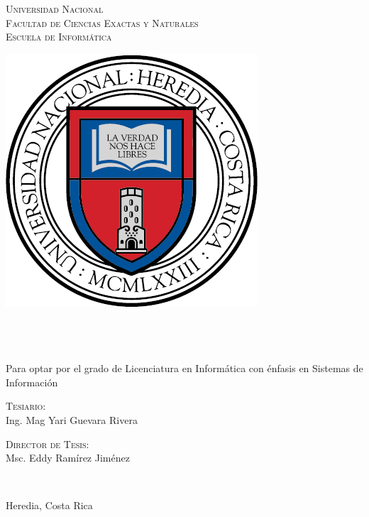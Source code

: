 \begin{titlepage}
	\begin{center}	
	\textcolor{unablue}{%
		\textsc{\LARGE Universidad Nacional}
		\\[0.5cm]
		\textsc{\Large Facultad de Ciencias Exactas y Naturales}
		\\[0.5cm]
		\textsc{\Large Escuela de Inform\'{a}tica}		
		\\[0.5cm]
	}
	\begin{center}
		\includegraphics[scale=0.5]{images/escudo.png}
	\end{center}
	
	
	\vfill
	 
		
	\HRule 
	\\[0.9cm]
	\doublespacing
	{
		\large
		\bfseries
		\thesistitle
	}
	\\[0.4cm]
	\singlespacing
	\HRule 
	\\[1.4cm]

	{
		\large Para optar por el grado de Licenciatura en Inform\'{a}tica con
		\'{e}nfasis en Sistemas de Informaci\'{o}n\\[1 cm]
	}
	
	\vfill
	 
	
	\begin{minipage}{0.45\textwidth}
		\begin{flushleft} 
			\large
			\textsc{Tesiario:}\\
			{Ing. Mag Yari Guevara Rivera}
		\end{flushleft}
	\end{minipage}
	\begin{minipage}{0.50\textwidth}
		\begin{flushright} 
			\large
			\textsc{Director de Tesis:}\\
			{Msc. Eddy Ram\'{i}rez Jim\'{e}nez}
		\end{flushright}
	\end{minipage}
	\\[1.6 cm]
	\vfill
	
	
	{
		\large Heredia, Costa Rica
	}
	\end{center}
\end{titlepage}